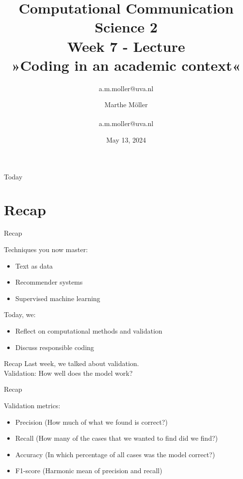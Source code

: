 \documentclass[compress]{beamer}
\title[Computational Communication Science 2]{\textbf{Computational Communication Science 2} \\Week 7 - Lecture\\ »Coding in an academic context«}
\author[Marthe Möller]{a.m.moller@uva.nl}\author[A. Marthe Möller]{Marthe Möller \\ ~ \\ \footnotesize{a.m.moller@uva.nl} \\}
\date{May 13, 2024}
\institute[Digital Society Minor, University of Amsterdam]{Digital Society Minor, University of Amsterdam}
\begin{document}
	
\begin{frame}{}
		\titlepage
\end{frame}
	
\begin{frame}{Today}
	\begin{tiny}
		\tableofcontents
	\end{tiny}
\end{frame}


\section{Recap}

\begin{frame}[fragile]{Recap} 
	
\begin{alertblock}{Techniques you now master:}
\begin{itemize}
	\item Text as data
	\item Recommender systems
	\item Supervised machine learning
\end{itemize}
\end{alertblock}

\begin{alertblock}{Today, we:}
\begin{itemize}
	\item Reflect on computational methods and validation
	\item Discuss responsible coding
\end{itemize}
\end{alertblock}
\end{frame}


\begin{frame}[fragile]{Recap} 	
Last week, we  talked about validation. \\
Validation: How well does the model work?
\end{frame}


\begin{frame}[fragile]{Recap} 	
\begin{alertblock}{Validation metrics:}
	\begin{itemize}
		\item Precision (How much of what we found is correct?)
		\item Recall (How many of the cases that we wanted to find did we find?)
		\item Accuracy (In which percentage of all cases was the model correct?)
		\item F1-score (Harmonic mean of precision and recall)
	\end{itemize}
\end{alertblock}
\end{frame}
\end{document}
